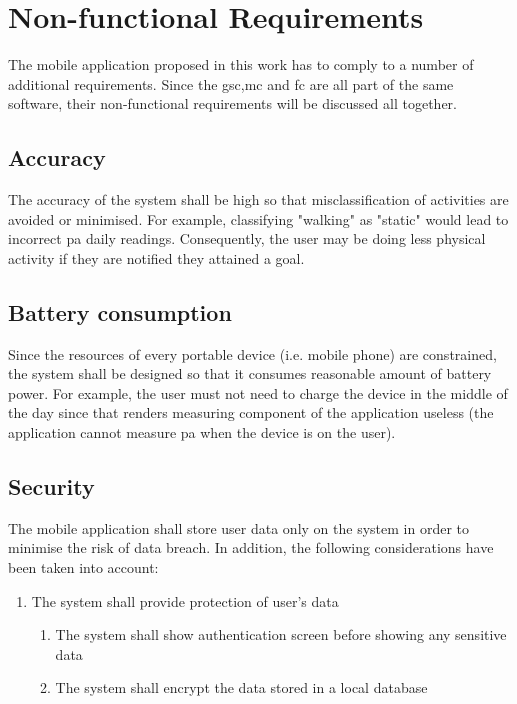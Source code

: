 \section{Non-functional Requirements}
The mobile application proposed in this work has to comply to a number of additional requirements. Since the \gls{gsc},\gls{mc} and \gls{fc} are all part of the same software, their non-functional requirements will be discussed all together.
    
    
    \subsection{Accuracy}
    The accuracy of the system shall be high so that misclassification of activities are avoided or minimised. For example, classifying "walking" as "static" would lead to incorrect \gls{pa} daily readings. Consequently, the user may be doing less physical activity if they are notified they attained a goal.
    
    \subsection{Battery consumption}
    Since the resources of every portable device (i.e. mobile phone) are constrained, the system shall be designed so that it consumes reasonable amount of battery power. For example, the user must not need to charge the device in the middle of the day since that renders measuring component of the application useless (the application cannot measure \gls{pa} when the device is on the user).
    
    \subsection{Security}
    The mobile application shall store user data only on the system in order to minimise the risk of data breach. In addition, the following considerations have been taken into account:
    
    \begin{enumerate}
        \item The system shall provide protection of user's data
            \begin{enumerate}
                \item The system shall show authentication screen before showing any sensitive data
                \item The system shall encrypt the data stored in a local database
            \end{enumerate}
    \end{enumerate}
    

